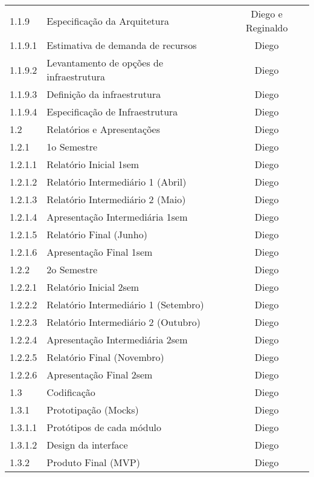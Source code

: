 \begin{table}[H]
\begin{tabular}{llc}
      1.1.9    & Especificação da Arquitetura              & Diego e Reginaldo \\
      1.1.9.1  & Estimativa de demanda de recursos         & Diego \\
      1.1.9.2  & Levantamento de opções de infraestrutura  & Diego \\
      1.1.9.3  & Definição da infraestrutura               & Diego \\
      1.1.9.4  & Especificação de Infraestrutura           & Diego \\
      1.2      & Relatórios e Apresentações                & Diego \\
      1.2.1    & 1o Semestre                               & Diego \\
      1.2.1.1  & Relatório Inicial 1sem                    & Diego \\
      1.2.1.2  & Relatório Intermediário 1 (Abril)         & Diego \\
      1.2.1.3  & Relatório Intermediário 2 (Maio)          & Diego \\
      1.2.1.4  & Apresentação Intermediária 1sem           & Diego \\
      1.2.1.5  & Relatório Final (Junho)                   & Diego \\
      1.2.1.6  & Apresentação Final 1sem                   & Diego \\
      1.2.2    & 2o Semestre                               & Diego \\
      1.2.2.1  & Relatório Inicial 2sem                    & Diego \\
      1.2.2.2  & Relatório Intermediário 1 (Setembro)      & Diego \\
      1.2.2.3  & Relatório Intermediário 2 (Outubro)       & Diego \\
      1.2.2.4  & Apresentação Intermediária 2sem           & Diego \\
      1.2.2.5  & Relatório Final (Novembro)                & Diego \\
      1.2.2.6  & Apresentação Final 2sem                   & Diego \\
      1.3      & Codificação                               & Diego \\
      1.3.1    & Prototipação (Mocks)                      & Diego \\
      1.3.1.1  & Protótipos de cada módulo                 & Diego \\
      1.3.1.2  & Design da interface                       & Diego \\
      1.3.2    & Produto Final (MVP)                       & Diego \\
      \bottomrule
    \end{tabular}
\end{table}
